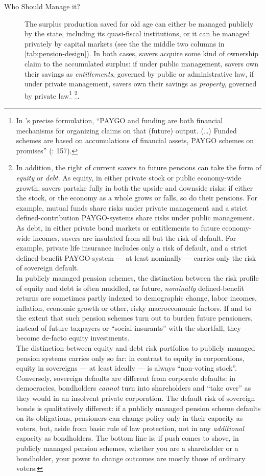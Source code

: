 \begin{description}
	\item[Who Should Manage it?] The surplus production saved for old age can either be managed publicly by the state, including its quasi-fiscal institutions, or it can be managed privately by capital markets (see the the middle two columns in \autoref{tab:pension-design}). In both cases, savers acquire some kind of ownership claim to the accumulated surplus: if under public management, savers own their savings as \emph{entitlements}, governed by public or administrative law, if under private management, savers own their savings as \emph{property}, governed by private law\footnote{
		In \citeauthor{Barr2005a}'s precise formulation, ``PAYGO and funding are both financial mechanisms for organizing claims on that (future) output. (\ldots) Funded schemes are based on accumulations of financial assets, PAYGO schemes on promises'' (\citeyear{Barr2005a}: 157).} \footnote{
		In addition, the right of current savers to future pensions can take the form of \emph{equity} or \emph{debt}. As equity, in either private stock or public economy-wide growth, savers partake fully in both the upside and downside risks: if either the stock, or the economy as a whole grows or falls, so do their pensions. For example, mutual funds share risks under private management and a strict defined-contribution PAYGO-systems share risks under public management. As debt, in either private bond markets or entitlements to future economy-wide incomes, savers are insulated from all but the risk of default. For example, private life insurance includes only a risk of default, and a strict defined-benefit PAYGO-system --- at least nominally --- carries only the risk of sovereign default. \\
		In publicly managed pension schemes, the distinction between the risk profile of equity and debt is often muddled, as future, \emph{nominally} defined-benefit returns are sometimes partly indexed to demographic change, labor incomes, inflation, economic growth or other, risky macroeconomic factors. If and to the extent that such pension schemes turn out to burden future pensioners, instead of future taxpayers or ``social insurants'' with the shortfall, they become de-facto equity investments. \\
		The distinction between equity and debt risk portfolios to publicly managed pension systems carries only so far: in contrast to equity in corporations, equity in sovereigns --- at least ideally --- is always ``non-voting stock''. Conversely, sovereign defaults are different from corporate defaults: in democracies, bondholders \emph{cannot} turn into shareholders and ``take over'' as they would in an insolvent private corporation. The default risk of sovereign bonds is qualitatively different: if a publicly managed pension scheme defaults on its obligations, pensioners can change policy only in their capacity as voters, but, aside from basic rule of law protection, not in any \emph{additional} capacity as bondholders. The bottom line is: if push comes to shove, in publicly managed pension schemes, whether you are a shareholder or a bondholder, your power to change outcomes are mostly those of ordinary voters.}.

\end{description}

